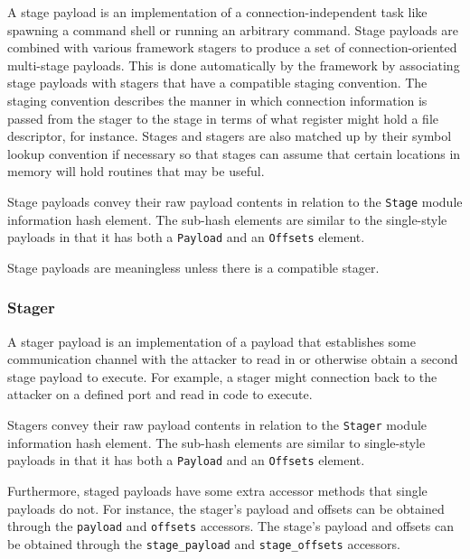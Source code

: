 \documentclass{report}
\begin{document}
\par
A stage payload is an implementation of a connection-independent
task like spawning a command shell or running an arbitrary command.
Stage payloads are combined with various framework stagers to
produce a set of connection-oriented multi-stage payloads.  This is
done automatically by the framework by associating stage payloads
with stagers that have a compatible staging convention.  The staging
convention describes the manner in which connection information is
passed from the stager to the stage in terms of what register might
hold a file descriptor, for instance.  Stages and stagers are also
matched up by their symbol lookup convention if necessary so that
stages can assume that certain locations in memory will hold
routines that may be useful.

\par
Stage payloads convey their raw payload contents in relation to the
\texttt{Stage} module information hash element.  The sub-hash
elements are similar to the single-style payloads in that it has
both a \texttt{Payload} and an \texttt{Offsets} element.

\par
Stage payloads are meaningless unless there is a compatible stager.

            \subsubsection{Stager}

\par
A stager payload is an implementation of a payload that establishes
some communication channel with the attacker to read in or otherwise
obtain a second stage payload to execute.  For example, a stager
might connection back to the attacker on a defined port and read in
code to execute.

\par
Stagers convey their raw payload contents in relation to the
\texttt{Stager} module information hash element.  The sub-hash
elements are similar to single-style payloads in that it has both a
\texttt{Payload} and an \texttt{Offsets} element.

\par
Furthermore, staged payloads have some extra accessor methods that
single payloads do not.  For instance, the stager's payload and
offsets can be obtained through the \texttt{payload} and
\texttt{offsets} accessors.  The stage's payload and offsets can be
obtained through the \texttt{stage\_payload} and
\texttt{stage\_offsets} accessors.
\end{document}
